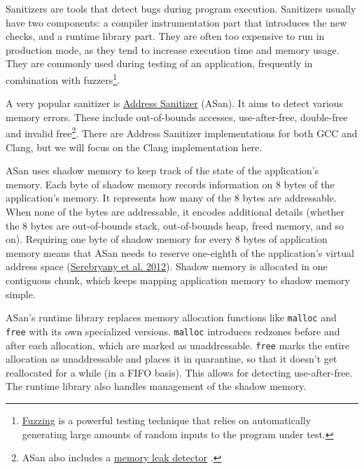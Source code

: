 \documentclass[
  a4paper,
]{report}
\begin{document}
Sanitizers  are tools that detect bugs during program
execution. Sanitizers usually have two components: a compiler
instrumentation part that introduces the new checks, and a runtime
library part. They are often too expensive to run in production mode, as
they tend to increase execution time and memory usage. They are commonly
used during testing of an application, frequently in combination with
fuzzers\footnote{\href{https://en.wikipedia.org/wiki/Fuzzing}{Fuzzing}
   is a powerful testing technique that relies on
  automatically generating large amounts of random inputs to the program
  under test.}.

A very popular sanitizer is
\href{https://clang.llvm.org/docs/AddressSanitizer.html}{Address
Sanitizer} (ASan). It aims to detect
various memory errors. These include out-of-bounds accesses,
use-after-free, double-free and invalid free\footnote{ASan also includes
  a \href{https://clang.llvm.org/docs/LeakSanitizer.html}{memory leak
  detector} .}. There are Address Sanitizer
implementations for both GCC  and Clang, but we
will focus on the Clang implementation here.

ASan uses shadow memory to keep track of the state
of the application's memory. Each byte of shadow memory records
information on 8 bytes of the application's memory. It represents how
many of the 8 bytes are addressable. When none of the bytes are
addressable, it encodes additional details (whether the 8 bytes are
out-of-bounds stack, out-of-bounds heap, freed memory, and so on).
Requiring one byte of shadow memory for every 8 bytes of application
memory means that ASan needs to reserve one-eighth of the application's
virtual address space (\protect\hyperlink{ref-Serebryany2012}{Serebryany
et al. 2012}). Shadow memory is allocated in one contiguous chunk, which
keeps mapping application memory to shadow memory simple.

ASan's runtime library replaces memory allocation functions like
\texttt{malloc} and \texttt{free} with its own
specialized versions. \texttt{malloc} introduces redzones
before and after each allocation, which are marked as unaddressable.
\texttt{free} marks the entire allocation as unaddressable and places it
in quarantine, so that it doesn't get reallocated for a while (in a FIFO
basis). This allows for detecting use-after-free. The runtime library
also handles management of the shadow memory.
\end{document}
